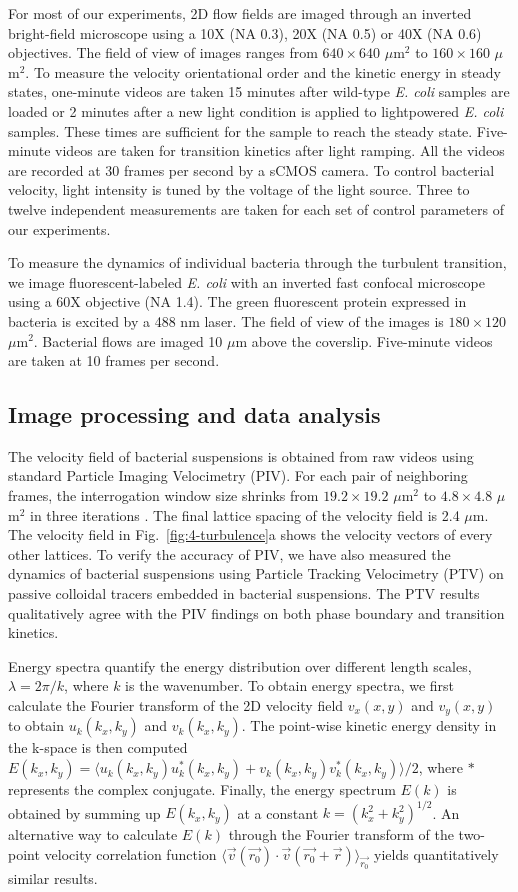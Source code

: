 For most of our experiments, 2D flow fields are imaged through an inverted bright-field microscope using a 10X (NA 0.3), 20X (NA 0.5) or 40X (NA 0.6) objectives. The field of view of images ranges from $640 \times 640$ $\mu$m$^2$ to $160 \times 160$ $\mu$m$^2$. To measure the velocity orientational order and the kinetic energy in steady states, one-minute videos are taken 15 minutes after wild-type \textit{E. coli} samples are loaded or 2 minutes after a new light condition is applied to lightpowered \textit{E. coli} samples. These times are sufficient for the sample to reach the steady state. Five-minute videos are taken for transition kinetics after light ramping. All the videos are recorded at 30 frames per second by a sCMOS camera. To control bacterial velocity, light intensity is tuned by the voltage of the light source. Three to twelve independent measurements are taken for each set of control parameters of our experiments.

To measure the dynamics of individual bacteria through the turbulent transition, we image fluorescent-labeled \textit{E. coli} with an inverted fast confocal microscope using a 60X objective (NA 1.4). The green fluorescent protein expressed in bacteria is excited by a 488 nm laser. The field of view of the images is $180 \times 120$ $\mu$m$^2$. Bacterial flows are imaged 10 $\mu$m above the coverslip. Five-minute videos are taken at 10 frames per second.

\subsection{Image processing and data analysis}
The velocity field of bacterial suspensions is obtained from raw videos using standard Particle Imaging Velocimetry (PIV). For each pair of neighboring frames, the interrogation window size shrinks from $19.2 \times 19.2$ $\mu$m$^2$ to $4.8 \times 4.8$ $\mu$m$^2$ in three iterations \cite{Scarano2001}. The final lattice spacing of the velocity field is 2.4 $\mu$m. The velocity field in Fig.~\ref{fig:4-turbulence}a shows the velocity vectors of every other lattices. To verify the accuracy of PIV,
we have also measured the dynamics of bacterial suspensions using Particle Tracking Velocimetry (PTV) on passive colloidal tracers embedded in bacterial suspensions. The PTV results qualitatively agree with the PIV findings on both phase boundary and transition kinetics.

Energy spectra quantify the energy distribution over different length scales, $\lambda = 2\pi/k$, where $k$ is the wavenumber. To obtain energy spectra, we first calculate the Fourier transform of the 2D velocity field $v_x(x,y)$ and $v_y(x,y)$ to obtain $u_k(k_x,k_y)$ and $v_k(k_x,k_y)$. The point-wise kinetic energy density in the k-space is then computed $E(k_x, k_y) = \langle u_k(k_x, k_y)u^*_k(k_x, k_y)+v_k(k_x, k_y)v_k^*(k_x, k_y)\rangle/2$, where $*$ represents the complex conjugate. Finally, the energy
spectrum $E(k)$ is obtained by summing up $E(k_x,k_y)$ at a constant $k=(k_x^2+k_y^2)^{1/2}$. An alternative way to calculate $E(k)$ through the Fourier transform of the two-point velocity correlation function $\langle \vec{v}(\vec{r_0})\cdot\vec{v}(\vec{r_0}+\vec{r})  \rangle_{\vec{r_0}}$ yields quantitatively similar results.

